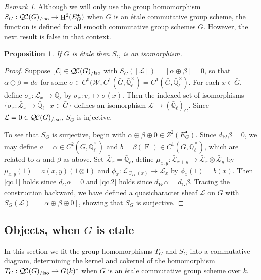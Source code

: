 \documentclass[CM,Submssn,SecEq]{degruyter-crelle} %
\theoremstyle{plain}
\newtheorem{proposition}[theorem]{Proposition}
\theoremstyle{definition}
\theoremstyle{remark}
\newtheorem{remark}[theorem]{Remark}
\newcommand{\EE}{\mathbb{\bar Q}_\ell}
\newcommand{\Fq}{k}
\newcommand{\EEx}{\EE^\times}
\newcommand{\Weil}[1]{\mathcal{W}_{#1}}
\newcommand{\Frob}[1]{\operatorname{F}_{#1}}
\DeclareMathOperator{\Hh}{H}
\newcommand{\tq}{{\ \vert\ }}
\newcommand{\TrFrob}[1]{T_{#1}}
\newcommand{\qcs}[1]{{\mathcal{#1}}}
\newcommand{\gqcs}[1]{{\mathcal{\bar #1}}}
\newcommand{\QC}{{\mathcal{Q\hskip-0.8pt C}}}
\newcommand{\QCiso}[1]{\QC(#1)_{/\text{iso}}}
\begin{document}
\begin{remark}
Although we will only use the group homomorphism $S_G : \QCiso{G}\to \Hh^2(E^\bullet_G)$ when $G$ is an \'etale commutative group scheme, the function is defined for all smooth commutative group schemes $G$.
However, the next result is false in that context.
\end{remark}

\begin{proposition}\label{prop:SGiso}
If $G$ is \'etale then $S_G$ is an isomorphism.
\end{proposition}
\begin{proof}
Suppose $[\qcs{L}] \in \QCiso{G}$ with $S_G([\qcs{L}]) = [\alpha \oplus \beta] = 0$,
so that $\alpha \oplus \beta = d\sigma$ for some $\sigma \in C^0(\Weil{},C^1({\bar G},\EEx) = C^1({\bar G},\EEx)$.
For each $x\in {\bar G}$, define $\sigma_x : \gqcs{L}_x \to \EE$ by $\sigma_x : v_x \mapsto \sigma(x)$.
Then the indexed set of isomorphisms $\{ \sigma_x : \gqcs{L}_x \to \EE \tq x\in {\bar G}\}$
defines an isomorphism $\qcs{L} \to (\EE)_G$.
Since $\qcs{L} = 0 \in \QCiso{G}$, $S_G$ is injective.

To see that $S_G$ is surjective, begin with $\alpha\oplus\beta\oplus 0 \in Z^2(E^\bullet_G)$.
Since $d_{\Weil{}} \beta = 0$, we may define $a = \alpha \in C^2({\bar G},\EEx)$ and
$b = \beta(\Frob{}) \in C^1({\bar G},\EEx)$, which are related to $\alpha$ and $\beta$ as above.
Set $\gqcs{L}_x = \EE$, define $\mu_{x,y} : \gqcs{L}_{x+y} \to \gqcs{L}_x\otimes\gqcs{L}_y$
by $\mu_{x,y}(1) = a(x,y) (1\otimes 1)$ and $\phi_x : \gqcs{L}_{\Frob{G}(x)} \to \gqcs{L}_x$ by $\phi_x(1)= b(x)$.
Then \ref{qc.1} holds since $d_G \alpha =0$ and \ref{qc.2} holds since $d_{\Weil{}}\alpha =d_G \beta$.
Tracing the construction backward, we have defined a quasicharacter sheaf $\qcs{L}$ on $G$ with
$S_G(\qcs{L}) = [\alpha\oplus\beta\oplus 0]$, showing that $S_G$ is surjective.
\end{proof}

\subsection{Objects, when $G$ is etale}\label{ssec:SandT}

In this section we fit the group homomorphisms $\TrFrob{G}$ and $S_G$ into a commutative diagram, determining the kernel and cokernel of the homomorphism $\TrFrob{G} : \QCiso{G} \to G(k)^*$ when $G$ is an \'etale commutative group scheme over $\Fq$.
\end{document}

